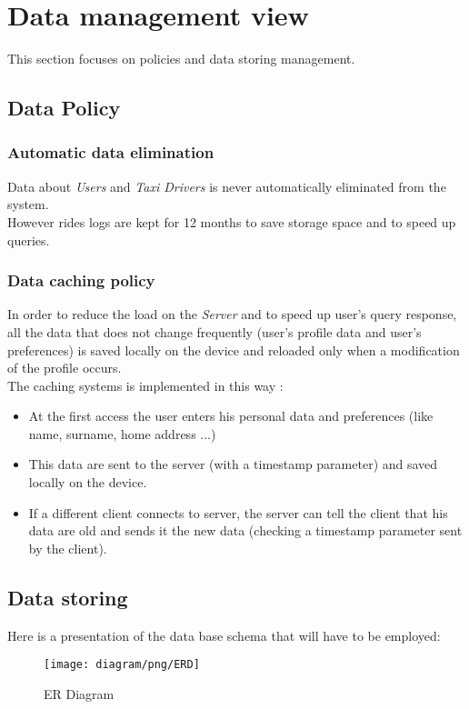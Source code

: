 \section{Data management view} %
\label{sec:data_management}
This section focuses on policies and data storing management.\\
\subsection{Data Policy} %
\label{sub:data_policy}
\subsubsection{Automatic data elimination} %
\label{ssub:data_elimination}
Data about \emph{Users} and \emph{Taxi Drivers} is never automatically eliminated from the system.\\
However rides logs are kept for 12 months to save storage space and to speed up queries.
\subsubsection{Data caching policy} %
\label{ssub:data_caching}
In order to reduce the load on the \emph{Server} and to speed up user's query response, all the data that does not change frequently (user's profile data and user's preferences) is saved locally on the device and reloaded only when a modification of the profile occurs.\\
The caching systems is implemented in this way :
\begin{itemize}
	\item At the first access the user enters his personal data and preferences (like name, surname, home address ...)
	\item This data are sent to the server (with a timestamp parameter) and saved locally on the device.
	\item If a different client connects to server, the server can tell the client that his data are old and sends it the new data (checking a timestamp parameter sent by the client).
\end{itemize}

\subsection{Data storing} %
Here is a presentation of the data base schema that will have to be employed:
\newpage
\label{sub:data_storing}
\begin{figure}[h!t]
\caption{ER Diagram}
\texttt{[image: diagram/png/ERD]}
\centering
\end{figure}
\newpage


